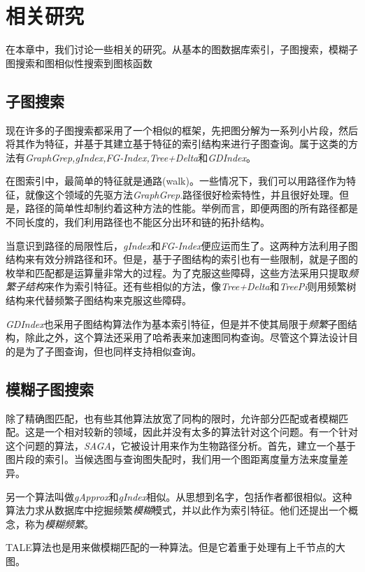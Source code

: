 \documentclass{article}
\begin{document}
\else

\fi
\chapter{相关研究}
在本章中，我们讨论一些相关的研究。从基本的图数据库索引，子图搜索，模糊子图搜索和图相似性搜索到图核函数
\section{子图搜索}
现在许多的子图搜索都采用了一个相似的框架，先把图分解为一系列小片段，然后将其作为特征，并基于其建立基于特征的索引结构来进行子图查询。属于这类的方法有\emph{GraphGrep,gIndex,FG-Index,Tree+Delta}和\emph{GDIndex}。

在图索引中，最简单的特征就是通路(walk)。一些情况下，我们可以用路径作为特征，就像这个领域的先驱方法\emph{GraphGrep}.路径很好检索特性，并且很好处理。但是，路径的简单性却制约着这种方法的性能。举例而言，即便两图的所有路径都是不同长度的，我们利用路径也不能区分出环和链的拓扑结构。

当意识到路径的局限性后，\emph{gIndex}和\emph{FG-Index}便应运而生了。这两种方法利用子图结构来有效分辨路径和环。但是，基于子图结构的索引也有一些限制，就是子图的枚举和匹配都是运算量非常大的过程。为了克服这些障碍，这些方法采用只提取\emph{频繁子结构}来作为索引特征。还有些相似的方法，像\emph{Tree+Delta}和\emph{TreePi}则用频繁树结构来代替频繁子图结构来克服这些障碍。

\emph{GDIndex}也采用子图结构算法作为基本索引特征，但是并不使其局限于\emph{频繁}子图结构，除此之外，这个算法还采用了哈希表来加速图同构查询。尽管这个算法设计目的是为了子图查询，但也同样支持相似查询。

\section{模糊子图搜索}
除了精确图匹配，也有些其他算法放宽了同构的限时，允许部分匹配或者模糊匹配。这是一个相对较新的领域，因此并没有太多的算法针对这个问题。有一个针对这个问题的算法，\emph{SAGA}，它被设计用来作为生物路径分析。首先，建立一个基于图片段的索引。当候选图与查询图失配时，我们用一个图距离度量方法来度量差异。

另一个算法叫做\emph{gApprox}和\emph{gIndex}相似。从思想到名字，包括作者都很相似。这种算法力求从数据库中挖掘频繁\emph{模糊}模式，并以此作为索引特征。他们还提出一个概念，称为\emph{模糊频繁}。

TALE算法也是用来做模糊匹配的一种算法。但是它着重于处理有上千节点的大图。
\end{document}
